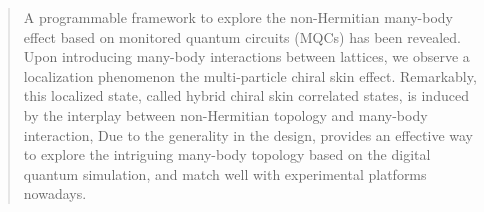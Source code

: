 \documentclass[longbibliography, aps, prx, amsmath, amssymb, amsfonts, twocolumn,superscriptaddress, footinbib]{revtex4-1}
\begin{document}
	
	
	
	\begin{abstract}

		A programmable framework to explore the non-Hermitian many-body effect based on monitored quantum circuits (MQCs) has been revealed. Upon introducing many-body interactions between lattices, we observe a localization phenomenon {\color{blue}{beyond}} the multi-particle chiral skin effect. Remarkably, this localized state, called hybrid chiral skin correlated states, is induced by the interplay between non-Hermitian topology and many-body interaction, {\color{blue}{which has been verified during the time evolutions within the proposed MQCs. This state differs from the localized state induced by the interplay between non-Hermiticity and many-body interaction only.}} Due to the generality in the design, {\color{blue}{the proposed MQC}} provides an effective way to explore the intriguing many-body topology based on the digital quantum simulation, and match well with experimental platforms nowadays. 

        



\end{abstract}
\end{document}
